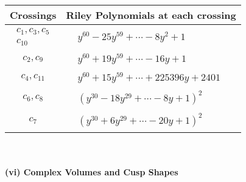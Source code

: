 \documentclass[1p]{elsarticle_modified}
\theoremstyle{definition}
\begin{document}
\begin{tabular}{m{50pt}|m{274pt}}
Crossings & \hspace{64pt}Riley Polynomials at each crossing \\
\hline $$\begin{aligned}c_{1},c_{3},c_{5}\\c_{10}\end{aligned}$$&$\begin{aligned}
&y^{60}-25 y^{59}+\cdots-8 y^2+1
\end{aligned}$\\
\hline $$\begin{aligned}c_{2},c_{9}\end{aligned}$$&$\begin{aligned}
&y^{60}+19 y^{59}+\cdots-16 y+1
\end{aligned}$\\
\hline $$\begin{aligned}c_{4},c_{11}\end{aligned}$$&$\begin{aligned}
&y^{60}+15 y^{59}+\cdots+225396 y+2401
\end{aligned}$\\
\hline $$\begin{aligned}c_{6},c_{8}\end{aligned}$$&$\begin{aligned}
&(y^{30}-18 y^{29}+\cdots-8 y+1)^{2}
\end{aligned}$\\
\hline $$\begin{aligned}c_{7}\end{aligned}$$&$\begin{aligned}
&(y^{30}+6 y^{29}+\cdots-20 y+1)^{2}
\end{aligned}$\\
\hline
\end{tabular}\\~\\
\newpage\flushleft \textbf{(vi) Complex Volumes and Cusp Shapes}
\end{document}
